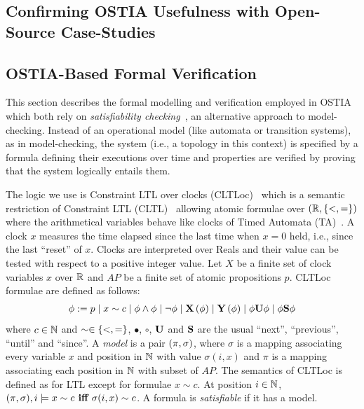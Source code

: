 \subsection{Confirming OSTIA Usefulness with Open-Source Case-Studies}\label{os}

\subsection{OSTIA-Based Formal Verification}\label{ver}


This section describes the formal modelling and verification employed in OSTIA  which both rely on \textit{satisfiability checking}~\cite{MPS13}, an alternative approach to model-checking.
Instead of an operational model (like automata or transition systems), as in model-checking, 
the system (i.e., a topology in this context) is specified by a formula defining their executions over time and properties are verified by proving that the system logically entails them.

The logic we use is Constraint LTL over clocks (CLTLoc)~\cite{BRS15} which is a semantic restriction of Constraint LTL (CLTL)~\cite{DD07} allowing atomic formulae over $(\mathbb{R}, \{ <,= \})$ where the arithmetical variables behave like clocks of Timed Automata (TA)~\cite{timed}.
A clock $x$ measures the time elapsed since the last time when $x=0$ held, i.e., since the last ``reset'' of $x$.
Clocks are interpreted over Reals and their value can be tested with respect to a positive integer value.
%
Let $X$ be a finite set of clock variables $x$ over $\mathbb{R}$ and $AP$ be a finite set of atomic propositions $p$.
CLTLoc formulae are defined as follows:
\begin{equation*}%
  \phi :=
  \begin{gathered}
    p \mid x\sim c \mid \phi \wedge \phi \mid \neg \phi \mid
   \X{\phi} \mid \Y{\phi} %
\mid \phi\U\phi \mid \phi\Snc\phi
  \end{gathered}
\end{equation*}
where %
$c \in \mathbb{N}$ and $\sim \in \{ <,= \}$, $\bullet$, $\circ$, $\mathbf{U}$ and $\mathbf{S}$ are the usual ``next'', ``previous'', ``until'' and ``since''.
A \textit{model} is a pair $(\pi, \sigma)$, where $\sigma$ is a mapping associating every variable $x$ and position in $\mathbb{N}$ with value $\sigma(i,x)$ and $\pi$ is a mapping associating each position in $\mathbb{N}$ with subset of $AP$. 
The semantics of CLTLoc is defined as for LTL except for formulae $x\sim c$. 
At position $i\in\mathbb{N}$, $ (\pi, \sigma), i \models x\sim c \textbf{ iff }  \sigma(i, x)\sim c$.
A formula is \textit{satisfiable} if it has a model.

